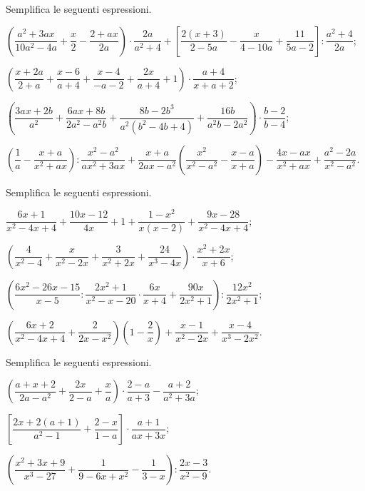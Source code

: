 \begin{esercizio}[\Ast]
Semplifica le seguenti espressioni.
\begin{enumeratea}
 \item $\left(\dfrac{a^{2}+3ax}{10a^{2}-4a}+\dfrac{x}{2}-\dfrac{2+ax}{2a}\right)\cdot {\dfrac{2a}{a^{2}+4}}+\left[\dfrac{2(x+3)}{2-5a}-\dfrac{x}{4-10a}+\dfrac{11}{5a-2}\right]:\dfrac{a^{2}+4}{2a}$;
 \item $\left(\dfrac{x+2a}{2+a}+\dfrac{x-6}{a+4}+\dfrac{x-4}{-a-2}+\dfrac{2x}{a+4}+1\right)\cdot{\dfrac{a+4}{x+a+2}}$;
 \item $\left(\dfrac{3ax+2b}{a^{2}}+\dfrac{6ax+8b}{2a^{2}-a^{2}b}+\dfrac{8b-2b^{3}}{a^{2}\left(b^{2}-4b+4\right)}+\dfrac{16b}{a^{2}b-2a^{2}}\right)\cdot {\dfrac{b-2}{b-4}}$;
 \item $\left(\dfrac{1}{a}-\dfrac{x+a}{x^{2}+ax}\right):\dfrac{x^{2}-a^{2}}{ax^2+3ax}+\dfrac{x+a}{2ax-a^{2}}\left(\dfrac{x^{2}}{x^{2}-a^{2}}-\dfrac{x-a}{x+a}\right)-\dfrac{4x-ax}{x^{2}+ax}+\dfrac{a^2-2a}{x^{2}-a^{2}}$.
\end{enumeratea}
\end{esercizio}

\begin{esercizio}[\Ast]
Semplifica le seguenti espressioni.
\begin{enumeratea}
 \item $\dfrac{6x+1}{x^{2}-4x+4}+\dfrac{10x-12}{4x}+1+\dfrac{1-x^{2}}{x(x-2)}+\dfrac{9x-28}{x^{2}-4x+4}$;
 \item $\left(\dfrac{4}{x^{2}-4}+\dfrac{x}{x^{2}-2x}+\dfrac{3}{x^{2}+2x}+\dfrac{24}{x^{3}-4x}\right)\cdot {\dfrac{x^{2}+2x}{x+6}}$;
 \item $\left(\dfrac{6x^{2}-26x-15}{x-5}:\dfrac{2x^{2}+1}{x^{2}-x-20}\cdot {\dfrac{6x}{x+4}+\dfrac{90x}{2x^{2}+1}}\right):\dfrac{12x^{2}}{2x^{2}+1}$;
 \item $\left(\dfrac{6x+2}{x^{2}-4x+4}+\dfrac{2}{2x-x^{2}}\right)\left(1-\dfrac{2}{x}\right)+\dfrac{x-1}{x^{2}-2x}+\dfrac{x-4}{x^{3}-2x^{2}}$.
\end{enumeratea}
\end{esercizio}

\begin{esercizio}[\Ast]
Semplifica le seguenti espressioni.
\begin{enumeratea}
 \item $\left(\dfrac{a+x+2}{2a-a^{2}}+\dfrac{2x}{2-a}+\dfrac{x}{a}\right)\cdot {\dfrac{2-a}{a+3}}-\dfrac{a+2}{a^{2}+3a}$;
 \item $\left[\dfrac{2x+2(a+1)}{a^{2}-1}+\dfrac{2-x}{1-a}\right]\cdot {\dfrac{a+1}{ax+3x}}$;
 \item $\left(\dfrac{x^{2}+3x+9}{x^{3}-27}+\dfrac{1}{9-6x+x^{2}}-\dfrac{1}{3-x}\right):\dfrac{2x-3}{x^{2}-9}$.
\end{enumeratea}
\end{esercizio}


